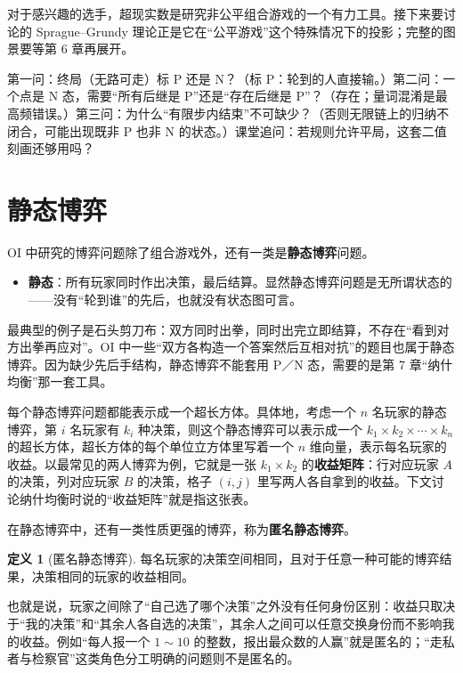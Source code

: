 \documentclass[UTF8,a4paper,11pt,oneside,openany,fontset=fandol]{ctexbook}
\theoremstyle{definition}
\newtheorem{definition}{定义}[chapter]
\begin{document}
对于感兴趣的选手，超现实数是研究非公平组合游戏的一个有力工具。接下来要讨论的 Sprague--Grundy 理论正是它在“公平游戏”这个特殊情况下的投影；完整的图景要等第 6 章再展开。

\begin{teach}[P/N 递推刻画的课堂三问]
第一问：终局（无路可走）标 P 还是 N？（标 P：轮到的人直接输。）第二问：一个点是 N 态，需要“所有后继是 P”还是“存在后继是 P”？（存在；量词混淆是最高频错误。）第三问：为什么“有限步内结束”不可缺少？（否则无限链上的归纳不闭合，可能出现既非 P 也非 N 的状态。）课堂追问：若规则允许平局，这套二值刻画还够用吗？
\end{teach}
\section{静态博弈}
OI 中研究的博弈问题除了组合游戏外，还有一类是\textbf{静态博弈}问题。
\begin{itemize}
\item \textbf{静态}：所有玩家同时作出决策，最后结算。显然静态博弈问题是无所谓状态的——没有“轮到谁”的先后，也就没有状态图可言。
\end{itemize}
最典型的例子是石头剪刀布：双方同时出拳，同时出完立即结算，不存在“看到对方出拳再应对”。OI 中一些“双方各构造一个答案然后互相对抗”的题目也属于静态博弈。因为缺少先后手结构，静态博弈不能套用 P／N 态，需要的是第 7 章“纳什均衡”那一套工具。

每个静态博弈问题都能表示成一个超长方体。具体地，考虑一个 $n$ 名玩家的静态博弈，第 $i$ 名玩家有 $k_i$ 种决策，则这个静态博弈可以表示成一个 $k_1\times k_2\times\cdots\times k_n$ 的超长方体，超长方体的每个单位立方体里写着一个 $n$ 维向量，表示每名玩家的收益。以最常见的两人博弈为例，它就是一张 $k_1\times k_2$ 的\textbf{收益矩阵}：行对应玩家 $A$ 的决策，列对应玩家 $B$ 的决策，格子 $(i,j)$ 里写两人各自拿到的收益。下文讨论纳什均衡时说的“收益矩阵”就是指这张表。

在静态博弈中，还有一类性质更强的博弈，称为\textbf{匿名静态博弈}。
\begin{definition}[匿名静态博弈]
每名玩家的决策空间相同，且对于任意一种可能的博弈结果，决策相同的玩家的收益相同。
\end{definition}
也就是说，玩家之间除了“自己选了哪个决策”之外没有任何身份区别：收益只取决于“我的决策”和“其余人各自选的决策”，其余人之间可以任意交换身份而不影响我的收益。例如“每人报一个 $1\sim10$ 的整数，报出最众数的人赢”就是匿名的；“走私者与检察官”这类角色分工明确的问题则不是匿名的。
\end{document}
